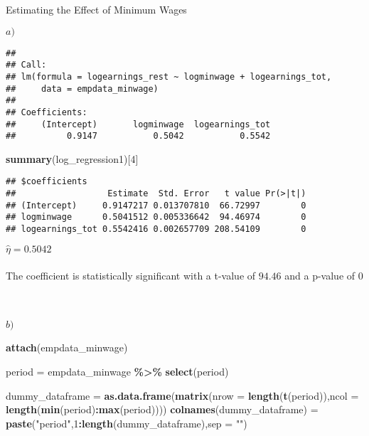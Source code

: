 \documentclass[
  ignorenonframetext,
]{beamer}
\newenvironment{Shaded}{\begin{snugshade}}{\end{snugshade}}
\newcommand{\DataTypeTok}[1]{\textcolor[rgb]{0.13,0.29,0.53}{#1}}
\newcommand{\DecValTok}[1]{\textcolor[rgb]{0.00,0.00,0.81}{#1}}
\newcommand{\KeywordTok}[1]{\textcolor[rgb]{0.13,0.29,0.53}{\textbf{#1}}}
\newcommand{\NormalTok}[1]{#1}
\newcommand{\OperatorTok}[1]{\textcolor[rgb]{0.81,0.36,0.00}{\textbf{#1}}}
\newcommand{\StringTok}[1]{\textcolor[rgb]{0.31,0.60,0.02}{#1}}
\begin{document}
\begin{frame}[fragile]{Estimating the Effect of Minimum Wages}
\begin{block}{\(a)\)}
\begin{verbatim}
## 
## Call:
## lm(formula = logearnings_rest ~ logminwage + logearnings_tot, 
##     data = empdata_minwage)
## 
## Coefficients:
##     (Intercept)       logminwage  logearnings_tot  
##          0.9147           0.5042           0.5542
\end{verbatim}

\begin{Shaded}
\begin{Highlighting}[]
\KeywordTok{summary}\NormalTok{(log\_regression1)[}\DecValTok{4}\NormalTok{]}
\end{Highlighting}
\end{Shaded}

\begin{verbatim}
## $coefficients
##                  Estimate  Std. Error   t value Pr(>|t|)
## (Intercept)     0.9147217 0.013707810  66.72997        0
## logminwage      0.5041512 0.005336642  94.46974        0
## logearnings_tot 0.5542416 0.002657709 208.54109        0
\end{verbatim}

\hfill\break
\(\hat{\eta} = 0.5042\)\\
~\\
The coefficient is statistically significant with a t-value of \(94.46\)
and a p-value of \(0\)\\
~\\
~\\
\end{block}

\begin{block}{\(b)\)}
\protect\hypertarget{b-1}{}
\hfill\break

\begin{Shaded}
\begin{Highlighting}[]
\KeywordTok{attach}\NormalTok{(empdata\_minwage)}

\NormalTok{period =}\StringTok{ }\NormalTok{empdata\_minwage }\OperatorTok{\%\textgreater{}\%}
\StringTok{  }\KeywordTok{select}\NormalTok{(period)}

\NormalTok{dummy\_dataframe =}\StringTok{ }\KeywordTok{as.data.frame}\NormalTok{(}\KeywordTok{matrix}\NormalTok{(}\DataTypeTok{nrow =} \KeywordTok{length}\NormalTok{(}\KeywordTok{t}\NormalTok{(period)),}\DataTypeTok{ncol =} \KeywordTok{length}\NormalTok{(}\KeywordTok{min}\NormalTok{(period)}\OperatorTok{:}\KeywordTok{max}\NormalTok{(period))))}
\KeywordTok{colnames}\NormalTok{(dummy\_dataframe) =}\StringTok{ }\KeywordTok{paste}\NormalTok{(}\StringTok{"period"}\NormalTok{,}\DecValTok{1}\OperatorTok{:}\KeywordTok{length}\NormalTok{(dummy\_dataframe),}\DataTypeTok{sep =} \StringTok{""}\NormalTok{)}



\end{Highlighting}
\end{Shaded}
\end{block}
\end{frame}
\end{document}
